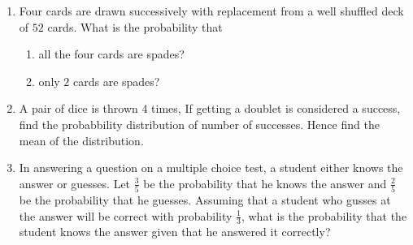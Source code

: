 \begin{enumerate}
\item Four cards are drawn successively with replacement from a well shuffled deck of $52$ cards. What is the probability that
\begin{enumerate}
\item all the four cards are spades?
\item only $2$ cards are spades?
\end{enumerate}

\item A pair of dice is thrown $4$ times, If getting a doublet is considered a success, find the probabbility distribution of number of successes. Hence find the mean of the distribution. 

\item In answering a question on a multiple choice test, a student either knows the answer or guesses. Let $\frac{3}{5}$ be the probability that he knows the answer and $\frac{2}{5}$ be the probability that he guesses. Assuming that a student who gusses at the answer will be correct with probability $\frac{1}{3}$, what is the probability that the student knows the answer given that he answered it correctly?
\end{enumerate}


